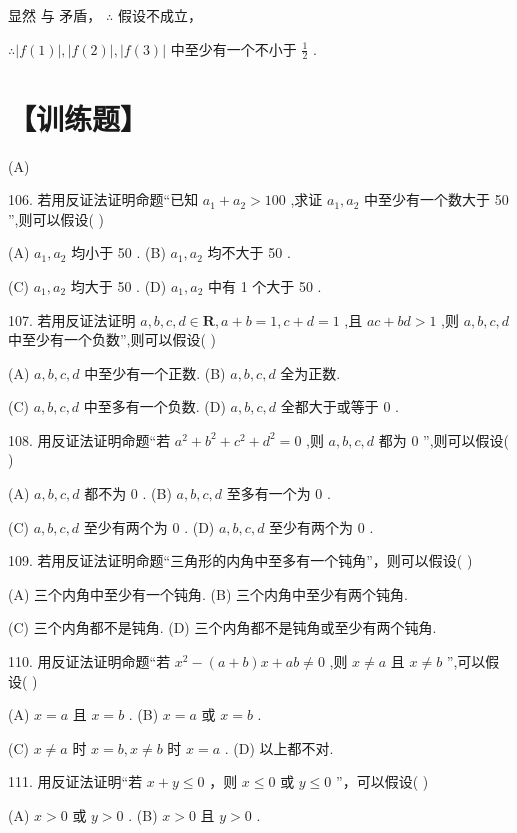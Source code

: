 \documentclass[10pt]{article}
\newcommand*\circled[1]{\tikz[baseline=(char.base)]{\node[shape=circle,draw,inner sep=1.5pt] (char) {\small #1};}}
\begin{document}
显然 \circled{4} 与 \circled{5} 矛盾， \(\therefore\) 假设不成立，

\(\therefore \left| {f\left( 1\right) }\right| ,\left| {f\left( 2\right) }\right| ,\left| {f\left( 3\right) }\right|\) 中至少有一个不小于 \(\frac{1}{2}\) .

\section*{【训练题】}

(A)

106. 若用反证法证明命题“已知 \({a}_{1} + {a}_{2} > {100}\) ,求证 \({a}_{1},{a}_{2}\) 中至少有一个数大于 50 ”,则可以假设( )

(A) \({a}_{1},{a}_{2}\) 均小于 50 . (B) \({a}_{1},{a}_{2}\) 均不大于 50 .

(C) \({a}_{1},{a}_{2}\) 均大于 50 . (D) \({a}_{1},{a}_{2}\) 中有 1 个大于 50 .

107. 若用反证法证明 \(a,b,c,d \in  \mathbf{R},a + b = 1,c + d = 1\) ,且 \({ac} + {bd} > 1\) ,则 \(a,b,c,d\) 中至少有一个负数”,则可以假设( )

(A) \(a,b,c,d\) 中至少有一个正数. (B) \(a,b,c,d\) 全为正数.

(C) \(a,b,c,d\) 中至多有一个负数. (D) \(a,b,c,d\) 全都大于或等于 0 .

108. 用反证法证明命题“若 \({a}^{2} + {b}^{2} + {c}^{2} + {d}^{2} = 0\) ,则 \(a,b,c,d\) 都为 0 ”,则可以假设( )

(A) \(a,b,c,d\) 都不为 0 . (B) \(a,b,c,d\) 至多有一个为 0 .

(C) \(a,b,c,d\) 至少有两个为 0 . (D) \(a,b,c,d\) 至少有两个为 0 .

109. 若用反证法证明命题“三角形的内角中至多有一个钝角”，则可以假设( )

(A) 三个内角中至少有一个钝角. (B) 三个内角中至少有两个钝角.

(C) 三个内角都不是钝角. (D) 三个内角都不是钝角或至少有两个钝角.

110. 用反证法证明命题“若 \({x}^{2} - \left( {a + b}\right) x + {ab} \neq  0\) ,则 \(x \neq  a\) 且 \(x \neq  b\) ”,可以假设( )

(A) \(x = a\) 且 \(x = b\) . (B) \(x = a\) 或 \(x = b\) .

(C) \(x \neq  a\) 时 \(x = b,x \neq  b\) 时 \(x = a\) . (D) 以上都不对.

111. 用反证法证明“若 \(x + y \leq  0\) ，则 \(x \leq  0\) 或 \(y \leq  0\) ”，可以假设( )

(A) \(x > 0\) 或 \(y > 0\) . (B) \(x > 0\) 且 \(y > 0\) .
\end{document}

